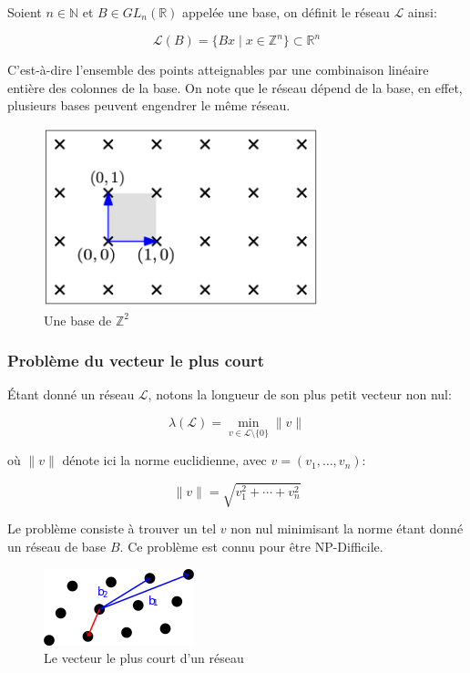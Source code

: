 \documentclass{article}
\begin{document}
Soient $n \in \mathbb{N}$ et $B \in GL_n(\mathbb{R})$ appelée une base, on définit le réseau $\mathcal{L}$ ainsi:

\[
    \mathcal{L}(B) = \{ Bx \mid x \in \mathbb{Z}^n \} \subset \mathbb{R}^n
\]

C'est-à-dire l'ensemble des points atteignables par une combinaison linéaire entière des colonnes de la base. On note que le réseau dépend de la base, en effet, plusieurs bases peuvent engendrer le même réseau.

\begin{figure}[h]
    \caption{Une base de $\mathbb{Z}^2$}
    \includegraphics[width=8cm]{lattice.png}
    \centering
\end{figure}

\subsubsection{Problème du vecteur le plus court}

Étant donné un réseau $\mathcal{L}$, notons la longueur de son plus petit vecteur non nul:

\[
    \lambda(\mathcal{L}) = \min_{v \in \mathcal{L} \setminus \{0\}} { \lVert v \rVert }
\]

où $\lVert v \rVert$ dénote ici la norme euclidienne, avec $v = (v_1, \dots, v_n)$:

\[
    \lVert v \rVert = \sqrt{v_1^2 + \cdots + v_n^2}
\]

Le problème consiste à trouver un tel $v$ non nul minimisant la norme étant donné un réseau de base $B$. Ce problème est connu pour être NP-Difficile.

\begin{figure}[h]
    \caption{Le vecteur le plus court d'un réseau}
    \includegraphics{SVP.png}
    \centering
\end{figure}
\end{document}
